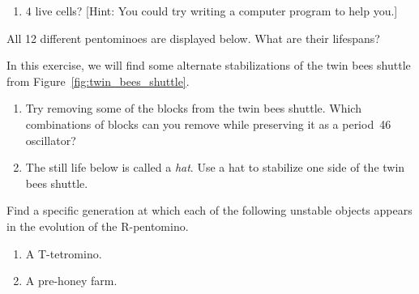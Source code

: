 \begin{multicols}{2}
\begin{problem}
\begin{enumerate}[label=\bf\color{ocre}(\alph*)]
	\item $4$ live cells? [Hint: You could try writing a computer program to help you.]
\end{enumerate}
\end{problem}


\mfilbreak


\begin{problem}\label{exer:pentominoes}
All 12 different pentominoes are displayed below. What are their lifespans?

\begin{center}
\end{center}
\end{problem}


\mfilbreak


\begin{problem}\label{exer:twin_bees_stabilize}
In this exercise, we will find some alternate stabilizations of the twin bees shuttle from Figure~\ref{fig:twin_bees_shuttle}.\smallskip

\begin{enumerate}[label=\bf\color{ocre}(\alph*)]
	\item Try removing some of the blocks from the twin bees shuttle. Which combinations of blocks can you remove while preserving it as a period~46 oscillator?
	
	\item The still life below is called a \emph{hat}. Use a hat to stabilize one side of the twin bees shuttle.
	\begin{center}
	\end{center}
\end{enumerate}
\end{problem}


\mfilbreak


\begin{problemstar}\label{exer:find_unstable}
Find a specific generation at which each of the following unstable objects appears in the evolution of the R-pentomino.\smallskip

\begin{enumerate}[label=\bf\color{ocre}(\alph*)]
	\item A T-tetromino.
	
	\item A pre-honey farm.
	

\end{enumerate}
\end{problemstar}
\end{multicols}

